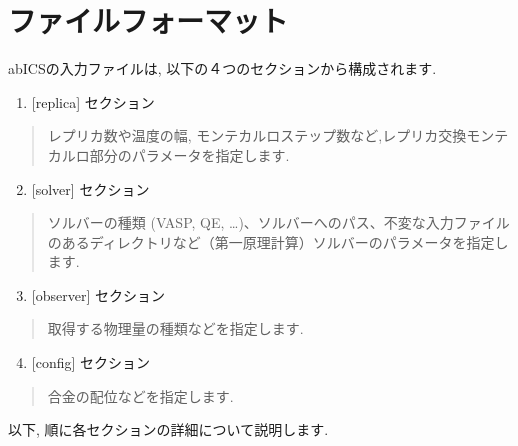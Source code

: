 \documentclass[letterpaper,10pt,dvipdfmx]{sphinxmanual}
\begin{document}
\chapter{ファイルフォーマット}
\label{\detokenize{file_specification/index::doc}}\label{\detokenize{file_specification/index:id1}}
abICSの入力ファイルは, 以下の４つのセクションから構成されます.
\begin{enumerate}
\item {} 
{[}replica{]} セクション

\end{enumerate}
\begin{quote}

レプリカ数や温度の幅, モンテカルロステップ数など,レプリカ交換モンテカルロ部分のパラメータを指定します.
\end{quote}
\begin{enumerate}
\setcounter{enumi}{1}
\item {} 
{[}solver{]} セクション

\end{enumerate}
\begin{quote}

ソルバーの種類 (VASP, QE, …)、ソルバーへのパス、不変な入力ファイルのあるディレクトリなど（第一原理計算）ソルバーのパラメータを指定します.
\end{quote}
\begin{enumerate}
\setcounter{enumi}{2}
\item {} 
{[}observer{]} セクション

\end{enumerate}
\begin{quote}

取得する物理量の種類などを指定します.
\end{quote}
\begin{enumerate}
\setcounter{enumi}{3}
\item {} 
{[}config{]} セクション

\end{enumerate}
\begin{quote}

合金の配位などを指定します.
\end{quote}

以下, 順に各セクションの詳細について説明します.
\end{document}
